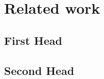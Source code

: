 \chapter{Related work}\label{Chap:relatedwork}
\lipsum[1]
\section{First Head}
\lipsum[2]
\section{Second Head}
\lipsum[3]

